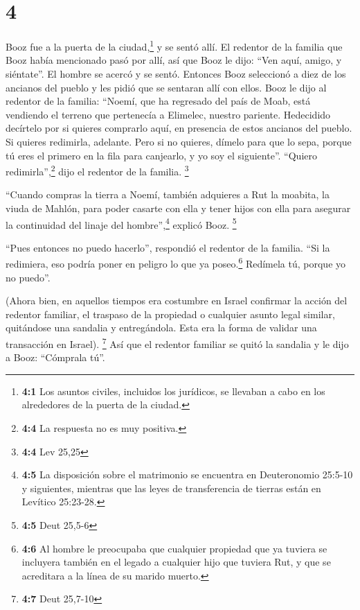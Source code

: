 \hypertarget{section-3}{%
\section{4}\label{section-3}}

 Booz fue a la puerta de la ciudad,\footnote{\textbf{4:1}
  Los asuntos civiles, incluidos los jurídicos, se llevaban a cabo en
  los alrededores de la puerta de la ciudad.} y se sentó allí. El
redentor de la familia que Booz había mencionado pasó por allí, así que
Booz le dijo: ``Ven aquí, amigo, y siéntate''. El hombre se acercó y se
sentó.  Entonces Booz seleccionó a diez de los ancianos
del pueblo y les pidió que se sentaran allí con ellos. 
Booz le dijo al redentor de la familia: ``Noemí, que ha regresado del
país de Moab, está vendiendo el terreno que pertenecía a Elimelec,
nuestro pariente.  Hedecidido decírtelo por si quieres
comprarlo aquí, en presencia de estos ancianos del pueblo. Si quieres
redimirla, adelante. Pero si no quieres, dímelo para que lo sepa, porque
tú eres el primero en la fila para canjearlo, y yo soy el siguiente''.
``Quiero redimirla'',\footnote{\textbf{4:4} La respuesta no es muy
  positiva.} dijo el redentor de la familia. \footnote{\textbf{4:4} Lev
  25,25}

 ``Cuando compras la tierra a Noemí, también adquieres a
Rut la moabita, la viuda de Mahlón, para poder casarte con ella y tener
hijos con ella para asegurar la continuidad del linaje del
hombre'',\footnote{\textbf{4:5} La disposición sobre el matrimonio se
  encuentra en Deuteronomio 25:5-10 y siguientes, mientras que las leyes
  de transferencia de tierras están en Levítico 25:23-28.} explicó Booz.
\footnote{\textbf{4:5} Deut 25,5-6}

 ``Pues entonces no puedo hacerlo'', respondió el redentor
de la familia. ``Si la redimiera, eso podría poner en peligro lo que ya
poseo.\footnote{\textbf{4:6} Al hombre le preocupaba que cualquier
  propiedad que ya tuviera se incluyera también en el legado a cualquier
  hijo que tuviera Rut, y que se acreditara a la línea de su marido
  muerto.} Redímela tú, porque yo no puedo''.

 (Ahora bien, en aquellos tiempos era costumbre en Israel
confirmar la acción del redentor familiar, el traspaso de la propiedad o
cualquier asunto legal similar, quitándose una sandalia y entregándola.
Esta era la forma de validar una transacción en Israel). \footnote{\textbf{4:7}
  Deut 25,7-10}  Así que el redentor familiar se quitó la
sandalia y le dijo a Booz: ``Cómprala tú''.

